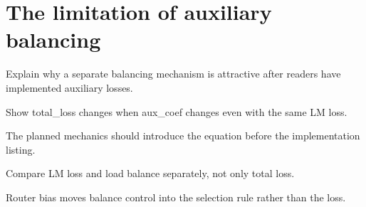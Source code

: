 \section{The limitation of auxiliary balancing}
\label{sec:ch09-the-limitation-of-auxiliary-balancing}

Explain why a separate balancing mechanism is attractive after readers have implemented auxiliary losses.



Show total\_loss changes when aux\_coef changes even with the same LM loss.



The planned mechanics should introduce the equation before the implementation listing.





\begin{checkpointbox}
Compare LM loss and load balance separately, not only total loss.
\end{checkpointbox}

Router bias moves balance control into the selection rule rather than the loss.
